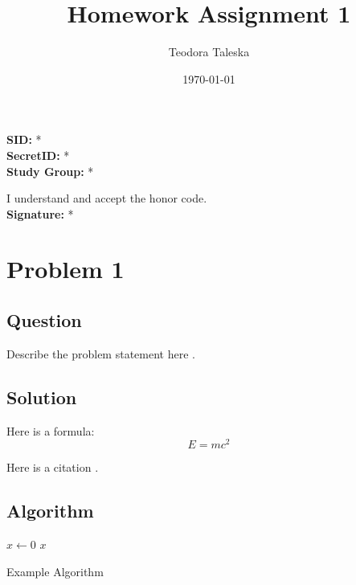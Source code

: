 \documentclass[a4paper,11pt]{article}
\begin{document}
\title{Homework Assignment 1}
\author{Teodora Taleska}
\date{\today}
\maketitle

\vfill
\begin{flushleft}
    \textbf{SID:} *\\
    \textbf{SecretID:} *\\
    \textbf{Study Group:} *\\
\end{flushleft}

\vspace{1cm}

\begin{flushright}
    I understand and accept the honor code.\\[0.5cm]
    \textbf{Signature:} *\\
\end{flushright}

\newpage



\section*{Problem 1}
\subsection*{Question}
Describe the problem statement here \cite{qu2023towards}.

\subsection*{Solution}
Here is a formula:
\begin{equation}
    E = mc^2
\end{equation}

Here is a citation \cite{somebook}.

\subsection*{Algorithm}
\begin{algorithm}[H]
\DontPrintSemicolon
\SetAlgoLined
{}
$x \gets 0$\;
\Return $x$\;
\caption{Example Algorithm}
\end{algorithm}
\end{document}
